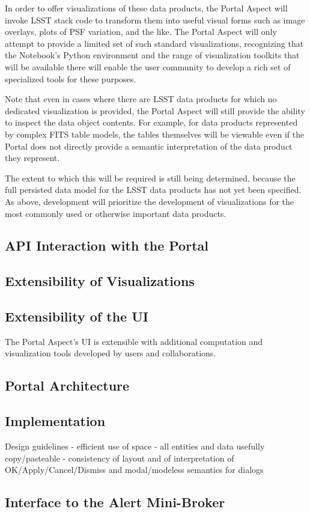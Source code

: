In order to offer visualizations of these data products, the Portal Aspect will invoke LSST stack code to transform them into useful visual forms such as image overlays, plots of PSF variation, and the like.
The Portal Aspect will only attempt to provide a limited set of such standard visualizations, recognizing that the Notebook's Python environment and the range of visualization toolkits that will be available there will enable the user community to develop a rich set of specialized tools for these purposes.

Note that even in cases where there are LSST data products for which no dedicated visualization is provided, the Portal Aspect will still provide the ability to inspect the data object contents.
For example, for data products represented by complex FITS table models, the tables themselves will be viewable even if the Portal does not directly provide a semantic interpretation of the data product they represent.

The extent to which this will be required is still being determined, because the full persisted data model for the LSST data products has not yet been specified.
As above, development will prioritize the development of visualizations for the most commonly used or otherwise important data products.

\subsection{API Interaction with the Portal}

\subsection{Extensibility of Visualizations}\label{extensibility-of-visualizations}

\subsection{Extensibility of the UI}\label{extensibility-of-the-ui}

The Portal Aspect's UI is extensible with additional computation and visualization tools developed by users and collaborations.

\subsection{Portal Architecture}

\subsection{Implementation}

Design guidelines
- efficient use of space
- all entities and data usefully copy/pasteable
- consistency of layout and of interpretation of OK/Apply/Cancel/Dismiss and modal/modeless semantics for dialogs

\subsection{Interface to the Alert Mini-Broker}

